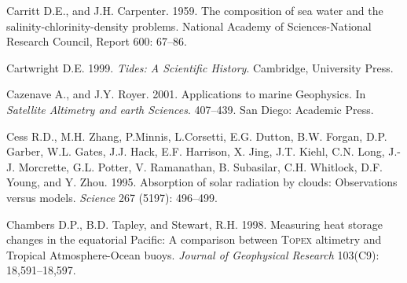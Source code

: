 \begin{thebibliography}{999}
Carritt D.E., and J.H. Carpenter.  1959. The composition of sea water
and the salinity-chlorinity-density problems. National Academy of
Sciences-National Research Council, Report 600: 67--86.
%

Cartwright D.E.  1999. \textit{Tides: A Scientific
  History}. Cambridge, University Press.
%

Cazenave A., and J.Y. Royer.  2001. Applications to marine
Geophysics. In \textit{Satellite Altimetry and earth
  Sciences}. 407--439. San Diego: Academic Press.
%

Cess R.D., M.H. Zhang, P.Minnis, L.Corsetti, E.G. Dutton, B.W. Forgan,
D.P. Garber, W.L. Gates, J.J. Hack, E.F. Harrison, X. Jing,
J.T. Kiehl, C.N.  Long, J.-J. Morcrette, G.L. Potter, V. Ramanathan,
B. Subasilar, C.H. Whitlock, D.F. Young, and Y. Zhou. 1995. Absorption
of solar radiation by clouds: Observations versus
models. \textit{Science} 267 (5197): 496--499.
%

Chambers D.P., B.D. Tapley, and Stewart, R.H.  1998. Measuring heat
storage changes in the equatorial Pacific: A comparison between
\textsc{Topex} altimetry and Tropical Atmo\-sphere-Ocean
buoys. \textit{Journal of Geophysical Research} 103(C9):
18,591--18,597.
%


\end{thebibliography}
